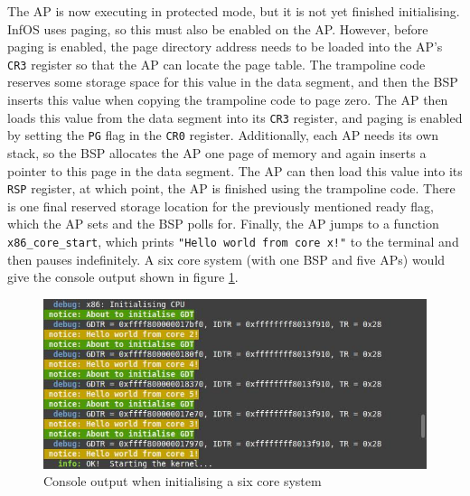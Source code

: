 \documentclass[bsc,frontabs,singlespacing,parskip,deptreport]{infthesis}     %
\begin{document}
The AP is now executing in protected mode, but it is not yet finished initialising. InfOS uses paging, so this must also be enabled on the AP. However, before paging is enabled, the page directory address needs to be loaded into the AP's \verb|CR3| register so that the AP can locate the page table. The trampoline code reserves some storage space for this value in the data segment, and then the BSP inserts this value when copying the trampoline code to page zero. The AP then loads this value from the data segment into its \verb|CR3| register, and paging is enabled by setting the \verb|PG| flag in the \verb|CR0| register. Additionally, each AP needs its own stack, so the BSP allocates the AP one page of memory and again inserts a pointer to this page in the data segment. The AP can then load this value into its \verb|RSP| register, at which point, the AP is finished using the trampoline code. There is one final reserved storage location for the previously mentioned ready flag, which the AP sets and the BSP polls for. Finally, the AP jumps to a function \verb|x86_core_start|, which prints \verb|"Hello world from core x!"| to the terminal and then pauses indefinitely. A six core system (with one BSP and five APs) would give the console output shown in figure \ref{hello-world}.

\begin{figure}[h]
    \centering
    \includegraphics[scale=0.6]{figures/hello-world.jpg}
    \caption{Console output when initialising a six core system}
    \label{hello-world}
\end{figure}
\end{document}
